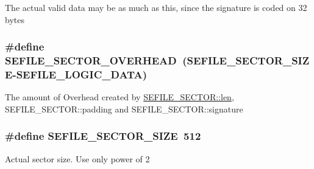 The actual valid data may be as much as this, since the signature is coded on 32 bytes \hypertarget{group___sector_defines_ga70a387176632325441aebca4839e19fc}{
\subsubsection[{S\-E\-F\-I\-L\-E\-\_\-\-S\-E\-C\-T\-O\-R\-\_\-\-O\-V\-E\-R\-H\-E\-A\-D}]{\setlength{\rightskip}{0pt plus 5cm}\#define S\-E\-F\-I\-L\-E\-\_\-\-S\-E\-C\-T\-O\-R\-\_\-\-O\-V\-E\-R\-H\-E\-A\-D~({\bf S\-E\-F\-I\-L\-E\-\_\-\-S\-E\-C\-T\-O\-R\-\_\-\-S\-I\-Z\-E}-\/{\bf S\-E\-F\-I\-L\-E\-\_\-\-L\-O\-G\-I\-C\-\_\-\-D\-A\-T\-A})}}\label{group___sector_defines_ga70a387176632325441aebca4839e19fc}
The amount of Overhead created by \hyperlink{struct_s_e_f_i_l_e___s_e_c_t_o_r_a7a0bf13d497fbcd2a5ac99511209bff0}{S\-E\-F\-I\-L\-E\-\_\-\-S\-E\-C\-T\-O\-R\-::len}, S\-E\-F\-I\-L\-E\-\_\-\-S\-E\-C\-T\-O\-R\-::padding and S\-E\-F\-I\-L\-E\-\_\-\-S\-E\-C\-T\-O\-R\-::signature \hypertarget{group___sector_defines_gad205a758c315675de3ad9f5f1cbf962d}{
\subsubsection[{S\-E\-F\-I\-L\-E\-\_\-\-S\-E\-C\-T\-O\-R\-\_\-\-S\-I\-Z\-E}]{\setlength{\rightskip}{0pt plus 5cm}\#define S\-E\-F\-I\-L\-E\-\_\-\-S\-E\-C\-T\-O\-R\-\_\-\-S\-I\-Z\-E~512}}\label{group___sector_defines_gad205a758c315675de3ad9f5f1cbf962d}
Actual sector size. Use only power of 2 